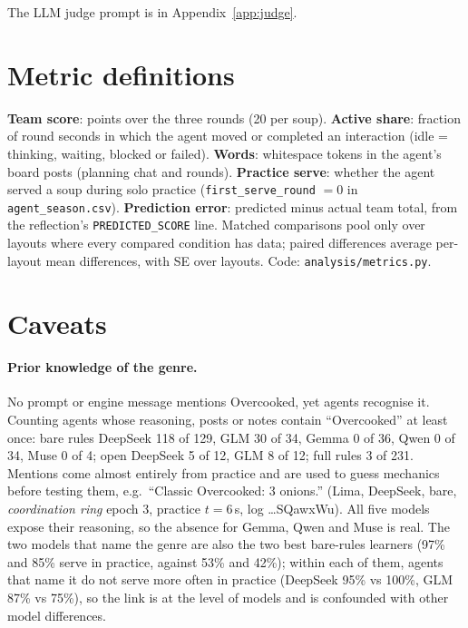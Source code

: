 \documentclass{article}
\begin{document}
The LLM judge prompt is in Appendix~\ref{app:judge}.

\section{Metric definitions}\label{app:metrics}
\textbf{Team score}: points over the three rounds (20 per soup). \textbf{Active share}: fraction of round seconds in which the agent moved or completed an interaction (idle = thinking, waiting, blocked or failed). \textbf{Words}: whitespace tokens in the agent's board posts (planning chat and rounds). \textbf{Practice serve}: whether the agent served a soup during solo practice (\texttt{first\_serve\_round} $=0$ in \texttt{agent\_season.csv}). \textbf{Prediction error}: predicted minus actual team total, from the reflection's \texttt{PREDICTED\_SCORE} line. Matched comparisons pool only over layouts where every compared condition has data; paired differences average per-layout mean differences, with SE over layouts. Code: \texttt{analysis/metrics.py}.

\section{Caveats}\label{app:caveats}
\paragraph{Prior knowledge of the genre.} No prompt or engine message mentions Overcooked, yet agents recognise it. Counting agents whose reasoning, posts or notes contain ``Overcooked'' at least once: bare rules DeepSeek 118 of 129, GLM 30 of 34, Gemma 0 of 36, Qwen 0 of 34, Muse 0 of 4; open DeepSeek 5 of 12, GLM 8 of 12; full rules 3 of 231. Mentions come almost entirely from practice and are used to guess mechanics before testing them, e.g.\ ``Classic Overcooked: 3 onions.'' (Lima, DeepSeek, bare, \emph{coordination ring} epoch 3, practice $t=6$\,s, log \ldots SQawxWu). All five models expose their reasoning, so the absence for Gemma, Qwen and Muse is real. The two models that name the genre are also the two best bare-rules learners (97\% and 85\% serve in practice, against 53\% and 42\%); within each of them, agents that name it do not serve more often in practice (DeepSeek 95\% vs 100\%, GLM 87\% vs 75\%), so the link is at the level of models and is confounded with other model differences.
\end{document}
